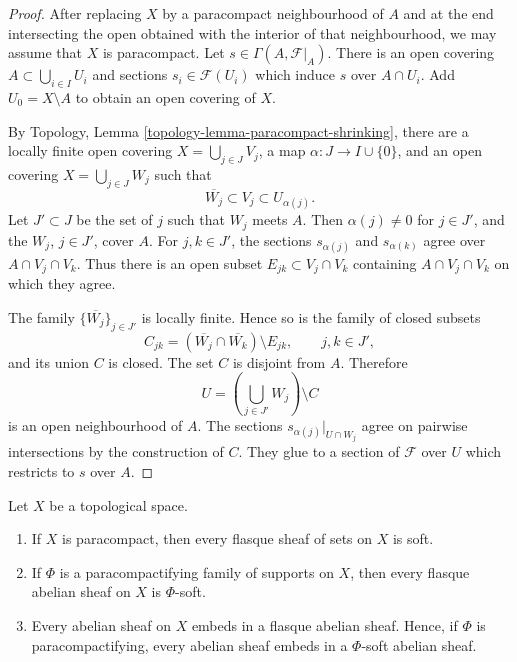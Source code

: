 \begin{proof}
After replacing $X$ by a paracompact neighbourhood of $A$ and at the end
intersecting the open obtained with the interior of that neighbourhood,
we may assume that $X$ is paracompact. Let
$s \in \Gamma(A, \mathcal{F}|_A)$. There is an open covering
$A \subset \bigcup_{i \in I} U_i$ and sections
$s_i \in \mathcal{F}(U_i)$ which induce $s$ over $A \cap U_i$.
Add $U_0 = X \setminus A$ to obtain an open covering of $X$.

By Topology, Lemma \ref{topology-lemma-paracompact-shrinking}, there are
a locally finite open covering $X = \bigcup_{j \in J} V_j$, a map
$\alpha : J \to I \cup \{0\}$, and an open covering
$X = \bigcup_{j \in J} W_j$ such that
$$
\overline{W_j} \subset V_j \subset U_{\alpha(j)}.
$$
Let $J' \subset J$ be the set of $j$ such that $W_j$ meets $A$.
Then $\alpha(j) \neq 0$ for $j \in J'$, and the $W_j$, $j \in J'$,
cover $A$. For $j,k \in J'$, the sections
$s_{\alpha(j)}$ and $s_{\alpha(k)}$ agree over $A \cap V_j \cap V_k$.
Thus there is an open subset $E_{jk} \subset V_j \cap V_k$ containing
$A \cap V_j \cap V_k$ on which they agree.

The family $\{\overline{W_j}\}_{j \in J'}$ is locally finite. Hence so is
the family of closed subsets
$$
C_{jk} =
(\overline{W_j} \cap \overline{W_k}) \setminus E_{jk},
\qquad j,k \in J',
$$
and its union $C$ is closed. The set $C$ is disjoint from $A$. Therefore
$$
U = \left(\bigcup_{j \in J'} W_j\right) \setminus C
$$
is an open neighbourhood of $A$. The sections
$s_{\alpha(j)}|_{U \cap W_j}$ agree on pairwise intersections by the
construction of $C$. They glue to a section of $\mathcal{F}$ over $U$
which restricts to $s$ over $A$.
\end{proof}

\begin{lemma}
\label{lemma-flasque-soft-family-supports}
Let $X$ be a topological space.
\begin{enumerate}
\item If $X$ is paracompact, then every flasque sheaf of sets on $X$ is
soft.
\item If $\Phi$ is a paracompactifying family of supports on $X$, then
every flasque abelian sheaf on $X$ is $\Phi$-soft.
\item Every abelian sheaf on $X$ embeds in a flasque abelian sheaf. Hence,
if $\Phi$ is paracompactifying, every abelian sheaf embeds in a
$\Phi$-soft abelian sheaf.
\end{enumerate}
\end{lemma}

